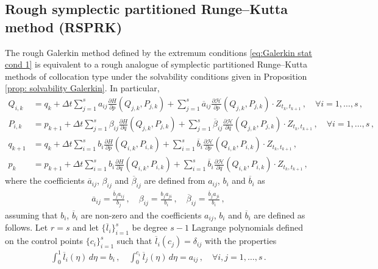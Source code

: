\documentclass[11pt, oneside]{article}
\numberwithin{equation}{section}
\theoremstyle{definition}
\newcommand{\ob}[1]{\overline{#1}}
\newcommand{\mc}[1]{\mathcal{#1}}
\newcommand{\mcal}[1]{\mc{#1}}
\def\p{{\partial}}
\def\p{\partial}
\begin{document}
\subsection{Rough symplectic partitioned Runge--Kutta method (RSPRK)}\label{subsec:rough RK}
The rough Galerkin method defined by the extremum conditions \eqref{eq:Galerkin stat cond 1} is equivalent to a rough analogue of symplectic partitioned Runge--Kutta methods of collocation type under the solvability conditions given in Proposition \ref{prop: solvability Galerkin}. In particular, 
\begin{subequations}\label{eq:RSPRK}
\begin{align}
    Q_{i,k} &= q_k + \Delta t \sum_{j=1}^s a_{ij} \frac{\p H}{\p p}(Q_{j,k}, P_{j,k}) + \sum_{j=1}^s \ob{a}_{ij}\frac{\p \mcal{H}}{\p p}(Q_{j,k}, P_{j,k})\cdot Z_{t_k, t_{k+1}}\,,\quad \forall i = 1,\ldots,s\,,\label{eq:RSPRK 1}\\
    P_{i,k} &= p_{k+1} + \Delta t \sum_{j=1}^s \beta_{ij} \frac{\p H}{\p q}(Q_{j,k}, P_{j,k}) + \sum_{j=1}^s \ob{\beta}_{ij}\frac{\p \mcal{H}}{\p q}(Q_{j,k}, P_{j,k})\cdot Z_{t_k, t_{k+1}}\,,\quad \forall i = 1,\ldots,s\,,\label{eq:RSPRK 2}\\
    q_{k+1} &= q_k + \Delta t \sum_{i=1}^s b_i \frac{\p H}{\p p}(Q_{i,k}, P_{i,k}) + \sum_{i=1}^s \ob{b}_i\frac{\p \mcal{H}}{\p p}(Q_{i,k}, P_{i,k})\cdot Z_{t_k, t_{k+1}}\,,\label{eq:RSPRK 3}\\
    p_k &= p_{k+1} + \Delta t \sum_{i=1}^s b_i \frac{\p H}{\p q}(Q_{i,k}, P_{i,k}) + \sum_{i=1}^s \ob{b}_i\frac{\p \mcal{H}}{\p q}(Q_{i,k}, P_{i,k})\cdot Z_{t_k, t_{k+1}}\,,\label{eq:RSPRK 4}
\end{align}
\end{subequations}
where the coefficients $\ob{a}_{ij}$, $\beta_{ij}$ and $\ob{\beta}_{ij}$ are defined from $a_{ij}$, $b_i$ and $\ob{b}_i$ as 
\begin{align}
    \ob{a}_{ij} = \frac{\ob{b}_j a_{ij}}{b_j}\,,\quad  \beta_{ij} = \frac{b_j a_{ji}}{b_i}\,,\quad \ob{\beta}_{ij} = \frac{\ob{b}_ja_{ji}}{b_i}\,,\label{eq:RSPRK coeff conds}
\end{align}
assuming that $b_i$, $\ob{b}_i$ are non-zero and the coefficients $a_{ij}$, $b_i$ and $\ob{b}_i$ are defined as follows. Let $r = s$ and let $\{\ob{l}_i\}_{i=1}^s$ be degree $s-1$ Lagrange polynomials defined on the control points $\{c_i\}_{i=1}^s$ such that $\ob{l}_i(c_j) = \delta_{ij}$ with the properties
\begin{align}\label{eq:collocation RK coeff def}
    \int_0^1 \ob{l}_i(\eta)\,d\eta = b_i\,,\quad \int_0^{c_i} \ob{l}_j(\eta)\,d\eta = a_{ij} \,, \quad \forall i,j=1,\ldots,s\,.
\end{align}
\end{document}

